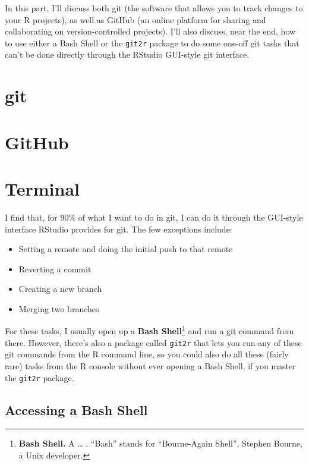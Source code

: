 \documentclass[]{tufte-book}
\providecommand{\tightlist}{%
  \setlength{\itemsep}{0pt}\setlength{\parskip}{0pt}}
\begin{document}
In this part, I'll discuss both git (the software that allows you to track changes to your
R projects), as well as GitHub (an online platform for sharing and collaborating on
version-controlled projects). I'll also discuss, near the end, how to use either a Bash
Shell or the \texttt{git2r} package to do some one-off git tasks that can't be done directly through
the RStudio GUI-style git interface.

\hypertarget{git}{%
\section{git}\label{git}}

\hypertarget{github}{%
\section{GitHub}\label{github}}

\hypertarget{terminal}{%
\section{Terminal}\label{terminal}}

I find that, for 90\% of what I want to do in git, I can do it through the GUI-style
interface RStudio provides for git. The few exceptions include:

\begin{itemize}
\tightlist
\item
  Setting a remote and doing the initial push to that remote
\item
  Reverting a commit
\item
  Creating a new branch
\item
  Merging two branches
\end{itemize}

For these tasks, I usually open up a \textbf{Bash Shell}\footnote{\textbf{Bash Shell.} A \ldots{} . ``Bash'' stands
  for ``Bourne-Again Shell'', Stephen Bourne, a Unix developer.} and run a git command from
there. However, there's also a package called \texttt{git2r} that lets you run any of these
git commands from the R command line, so you could also do all these (fairly rare) tasks
from the R console without ever opening a Bash Shell, if you master the \texttt{git2r} package.

\hypertarget{accessing-a-bash-shell}{%
\subsection{Accessing a Bash Shell}\label{accessing-a-bash-shell}}
\end{document}
